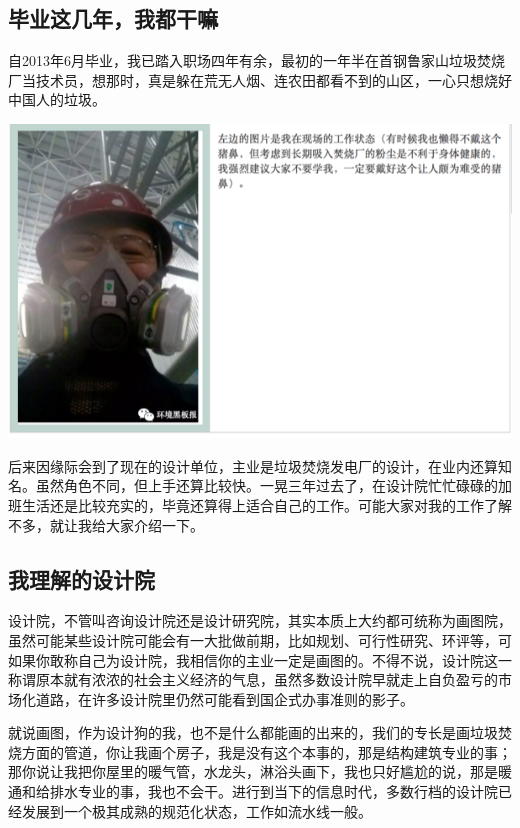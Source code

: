 \documentclass[
]{book}
\begin{document}
\hypertarget{ux6bd5ux4e1aux8fd9ux51e0ux5e74ux6211ux90fdux5e72ux561b}{%
\subsection{毕业这几年，我都干嘛}\label{ux6bd5ux4e1aux8fd9ux51e0ux5e74ux6211ux90fdux5e72ux561b}}

自2013年6月毕业，我已踏入职场四年有余，最初的一年半在首钢鲁家山垃圾焚烧厂当技术员，想那时，真是躲在荒无人烟、连农田都看不到的山区，一心只想烧好中国人的垃圾。

\includegraphics[width=8.33in]{images/sisi1}

后来因缘际会到了现在的设计单位，主业是垃圾焚烧发电厂的设计，在业内还算知名。虽然角色不同，但上手还算比较快。一晃三年过去了，在设计院忙忙碌碌的加班生活还是比较充实的，毕竟还算得上适合自己的工作。可能大家对我的工作了解不多，就让我给大家介绍一下。

\hypertarget{ux6211ux7406ux89e3ux7684ux8bbeux8ba1ux9662}{%
\subsection{我理解的设计院}\label{ux6211ux7406ux89e3ux7684ux8bbeux8ba1ux9662}}

设计院，不管叫咨询设计院还是设计研究院，其实本质上大约都可统称为画图院，虽然可能某些设计院可能会有一大批做前期，比如规划、可行性研究、环评等，可如果你敢称自己为设计院，我相信你的主业一定是画图的。不得不说，设计院这一称谓原本就有浓浓的社会主义经济的气息，虽然多数设计院早就走上自负盈亏的市场化道路，在许多设计院里仍然可能看到国企式办事准则的影子。

就说画图，作为设计狗的我，也不是什么都能画的出来的，我们的专长是画垃圾焚烧方面的管道，你让我画个房子，我是没有这个本事的，那是结构建筑专业的事；那你说让我把你屋里的暖气管，水龙头，淋浴头画下，我也只好尴尬的说，那是暖通和给排水专业的事，我也不会干。进行到当下的信息时代，多数行档的设计院已经发展到一个极其成熟的规范化状态，工作如流水线一般。
\end{document}
